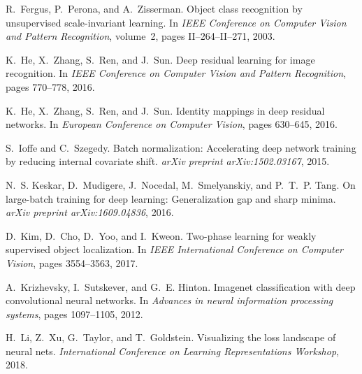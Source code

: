 \documentclass{bmvc2k}
\begin{document}
\begin{thebibliography}{33}
R.~Fergus, P.~Perona, and A.~Zisserman.
\newblock Object class recognition by unsupervised scale-invariant learning.
\newblock In \emph{IEEE Conference on Computer Vision and Pattern Recognition},
  volume~2, pages II--264--II--271, 2003.

K.~He, X.~Zhang, S.~Ren, and J.~Sun.
\newblock Deep residual learning for image recognition.
\newblock In \emph{IEEE Conference on Computer Vision and Pattern Recognition},
  pages 770--778, 2016{}.

K.~He, X.~Zhang, S.~Ren, and J.~Sun.
\newblock Identity mappings in deep residual networks.
\newblock In \emph{European Conference on Computer Vision}, pages 630--645,
  2016{}.

S.~Ioffe and C.~Szegedy.
\newblock Batch normalization: Accelerating deep network training by reducing
  internal covariate shift.
\newblock \emph{arXiv preprint arXiv:1502.03167}, 2015.

N.~S. Keskar, D.~Mudigere, J.~Nocedal, M.~Smelyanskiy, and P.~T.~P. Tang.
\newblock On large-batch training for deep learning: Generalization gap and
  sharp minima.
\newblock \emph{arXiv preprint arXiv:1609.04836}, 2016.

D.~Kim, D.~Cho, D.~Yoo, and I.~Kweon.
\newblock Two-phase learning for weakly supervised object localization.
\newblock In \emph{IEEE International Conference on Computer Vision}, pages
  3554--3563, 2017.

A.~Krizhevsky, I.~Sutskever, and G.~E. Hinton.
\newblock Imagenet classification with deep convolutional neural networks.
\newblock In \emph{Advances in neural information processing systems}, pages
  1097--1105, 2012.

H.~Li, Z.~Xu, G.~Taylor, and T.~Goldstein.
\newblock Visualizing the loss landscape of neural nets.
\newblock \emph{International Conference on Learning Representations Workshop},
  2018{}.


\end{thebibliography}
\end{document}

